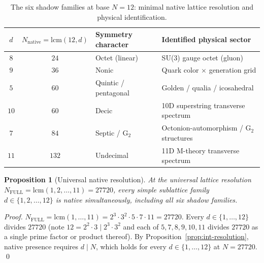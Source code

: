 \documentclass[11pt,a4paper]{article}
\newtheorem{proposition}[theorem]{Proposition}
\theoremstyle{definition}
\theoremstyle{remark}
\begin{document}
\begin{table}[ht]
\centering
\begin{tabular}{c|c|l|l}
\toprule
$d$ & $N_{\text{native}} = \mathrm{lcm}(12,d)$ & Symmetry character & Identified physical sector \\ \midrule
$8$  & $24$  & Octet (linear) & SU(3) gauge octet (gluon) \\
$9$  & $36$  & Nonic & Quark color $\times$ generation grid \\
$5$  & $60$  & Quintic / pentagonal & Golden / qualia / icosahedral \\
$10$ & $60$  & Decic & 10D superstring transverse spectrum \\
$7$  & $84$  & Septic / G$_{2}$ & Octonion-automorphism / G$_{2}$ structures \\
$11$ & $132$ & Undecimal & 11D M-theory transverse spectrum \\ \bottomrule
\end{tabular}
\caption{The six shadow families at base $N=12$: minimal native lattice resolution and physical identification.}\label{tab:shadow-forces}
\end{table}

\begin{proposition}[Universal native resolution]\label{prop:universal-native}
At the universal lattice resolution $N_{\mathrm{FULL}} = \mathrm{lcm}(1,2,\ldots,11) = 27720$, every simple sublattice family $d \in \{1,2,\ldots,12\}$ is native simultaneously, including all six shadow families.
\end{proposition}

\begin{proof}
$N_{\mathrm{FULL}} = \mathrm{lcm}(1,\ldots,11) = 2^{3}\cdot 3^{2}\cdot 5\cdot 7\cdot 11 = 27720$. Every $d\in\{1,\ldots,12\}$ divides $27720$ (note $12 = 2^{2}\cdot 3 \mid 2^{3}\cdot 3^{2}$ and each of $5,7,8,9,10,11$ divides $27720$ as a single prime factor or product thereof). By Proposition~\ref{prop:int-resolution}, native presence requires $d\mid N$, which holds for every $d\in\{1,\ldots,12\}$ at $N=27720$. \qed
\end{proof}
\end{document}
